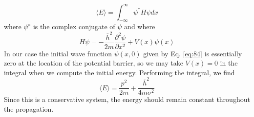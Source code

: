 \begin{equation}\label{eq:86}
\langle E\rangle=\int_{-\infty}^{\infty} \psi^{*} H \psi d x
\end{equation}
where $\psi^∗$ is the complex conjugate of $\psi$ and where
\begin{equation}\label{eq:87}
H \psi=-\frac{\bar{h}^{2}}{2 m} \frac{\partial^{2} \psi}{\partial x^{2}}+V(x) \psi(x)
\end{equation}
In our case the initial wave function $\psi(x,0)$ given by Eq. \ref{eq:84} is essentially zero at
the location of the potential barrier, so we may take $V(x) = 0$ in the integral when
we compute the initial energy. Performing the integral, we find
\begin{equation}\label{eq:88}
\langle E\rangle=\frac{p^{2}}{2 m}+\frac{\bar{h}^{2}}{4 m \sigma^{2}}
\end{equation}
Since this is a conservative system, the energy should remain constant throughout
the propagation.
